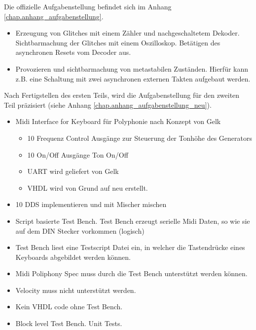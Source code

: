 Die offizielle Aufgabenstellung befindet sich im Anhang \ref{chap.anhang_aufgabenstellung}. 
 
\begin{itemize}
	\item Erzeugung von Glitches mit einem Zähler und nachgeschaltetem Dekoder. Sichtbarmachung der Glitches mit einem Oszilloskop. Betätigen des asynchronen Resets vom Decoder aus.

	\item Provozieren und sichtbarmachung von metastabilen Zuständen. Hierfür kann z.B. eine Schaltung mit zwei asynchronen externen Takten aufgebaut werden.
\end{itemize}  


Nach Fertigstellen des ersten Teils, wird die Aufgabenstellung für den zweiten Teil präzisiert (siehe Anhang \ref{chap.anhang_aufgabenstellung_neu}).

\begin{itemize}
\item Midi Interface for Keyboard für Polyphonie nach Konzept von Gelk
\begin{itemize}
    \item 10 Frequenz Control Ausgänge zur Steuerung der Tonhöhe des Generators
    \item 10 On/Off Ausgänge Ton On/Off
    \item UART wird geliefert von Gelk
    \item VHDL wird von Grund auf neu erstellt.
\end{itemize}
\item 10 DDS implementieren und mit Mischer mischen
\item Script basierte Test Bench. Test Bench erzeugt serielle Midi Daten, so wie sie auf dem DIN Stecker vorkommen (logisch)
\item Test Bench liest eine Testscript Datei ein, in welcher die Tastendrücke eines Keyboards abgebildet werden können. 
\item Midi Poliphony Spec muss durch die Test Bench unterstützt werden können. 
\item Velocity muss nicht unterstützt werden.
\item Kein VHDL code ohne Test Bench.
\item Block level Test Bench. Unit Tests.
\end{itemize}
